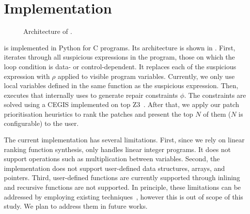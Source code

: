 \section{Implementation}
\label{sec:implementation}


\begin{figure}[t]
	\centering
    \scalebox{0.9}{}
	\caption{Architecture of \projName.}
	\label{fig:architecture}
\end{figure}


\projName is implemented in Python for C programs. Its architecture is shown in . First, \projName iterates through all suspicious expressions in the program, \ie those on which the loop condition is data- or control-dependent. It replaces each of the suspicious expression with $\rho$ applied to visible program variables. Currently, we only use local variables defined in the same function as the suspicious expression. Then, \projName executes \dtaRepair that internally uses \rfsRepair to generate repair constraints $\phi$. The constraints are solved using a CEGIS implemented on top Z3~\cite{deMoura2008Z3}. After that, we apply our patch prioritisation heuristics to rank the patches and present the top $N$ of them ($N$ is configurable) to the user.

The current implementation has several limitations. First, since we rely on linear ranking function synthesis, \projName only handles linear integer programs. It does not support operations such as multiplication between variables. Second, the implementation does not support user-defined data structures, arrays, and pointers. Third, user-defined functions are currently supported through inlining and recursive functions are not supported. In principle, these limitations can be addressed by employing existing techniques~\cite{magill2007arithmetic}, however this is out of scope of this study. We plan to address them in future works. 
